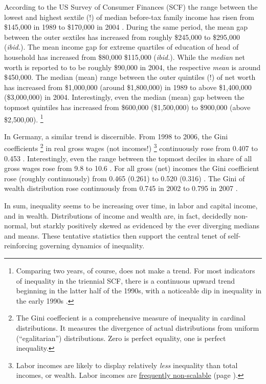 According to the US Survey of Consumer Finances (SCF) the range between the lowest and highest sextile (!) of median before-tax family income has risen from \$145,000 in 1989 to \$170,000 in 2004 \citep{Bucks2006}.
During the same period, the mean gap between the outer sextiles has increased from roughly \$245,000 to \$295,000 (\emph{ibid.}).
The mean income gap for extreme quartiles of education of head of household has increased from \$80,000 \$115,000 (\emph{ibid.}).
While the \emph{median} net worth is reported to to be roughly \$90,000 in 2004, the respective \emph{mean} is around \$450,000.
The median (mean) range between the outer quintiles (!) of net worth has increased from \$1,000,000 (around \$1,800,000) in 1989 to above \$1,400,000 (\$3,000,000) in 2004.
Interestingly, even the median (mean) gap between the topmost quintiles has increased from \$600,000 (\$1,500,000) to \$900,000 (above \$2,500,00).
\footnote{
	Comparing two years, of course, does not make a trend.
	For most indicators of inequality in the triennial SCF, there is a continuous upward trend beginning in the latter half of the 1990s, with a noticeable dip in inequality in the early 1990s \citep{Bucks2006}.
}

In Germany, a similar trend is discernible.
From 1998 to 2006, the Gini coefficients
\footnote{
	The Gini coeffecient is a comprehensive measure of inequality in cardinal distributions.
	It measures the divergence of actual distributions from uniform (``egalitarian'') distributions.
	Zero is perfect equality, one is perfect inequality.
}
in real gross wages (not incomes!)
\footnote{
	Labor incomes are likely to display relatively \emph{less} inequality than total incomes, or wealth.
	Labor incomes are \hyperref[sec:Extremistan]{frequently non-scalable} (page \pageref{sec:Extremistan}).
}
continuously rose from 0.407 to 0.453 \citep[14]{Bundesregierung2006}.
Interestingly, even the range between the topmost deciles in share of all gross wages rose from 9.8 to 10.6 \citep[64]{Grabka2007a}.
For all gross (net) incomes the Gini coefficient rose (roughly continuously) from 0.465 (0.261) to 0.520 (0.316) \citeyearpar[82]{Grabka2007a}.
The Gini of wealth distribution rose continuously from 0.745 in 2002 to 0.795 in 2007 \citeyearpar[138]{Grabka2007a}.

In sum, inequality seems to be increasing over time, in labor and capital income, and in wealth.
Distributions of income and wealth are, in fact, decidedly non-normal, but starkly positively skewed as evidenced by the ever diverging medians and means.
These tentative statistics then support the central tenet of self-reinforcing governing dynamics of inequality.

